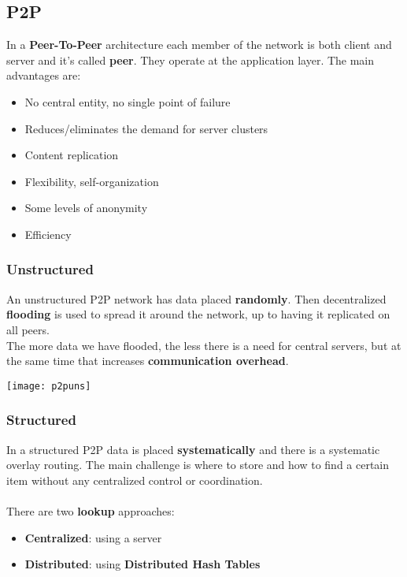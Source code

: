 \subsection{P2P}
In a \textbf{Peer-To-Peer} architecture each member of the network is both client and server and it's called \textbf{peer}. They operate at the application layer. The main advantages are:
\begin{itemize}
	\item No central entity, no single point of failure
	\item Reduces/eliminates the demand for server clusters
	\item Content replication
	\item Flexibility, self-organization
	\item Some levels of anonymity
	\item Efficiency
\end{itemize}

\subsubsection{Unstructured}
An unstructured P2P network has data placed \textbf{randomly}. Then decentralized \textbf{flooding} is used to spread it around the network, up to having it replicated on all peers.\\
The more data we have flooded, the less there is a need for central servers, but at the same time that increases \textbf{communication overhead}.
\begin{center}
	\texttt{[image: p2puns]}
\end{center}

\subsubsection{Structured}
In a structured P2P data is placed \textbf{systematically} and there is a systematic overlay routing. The main challenge is where to store and how to find a certain item without any centralized control or coordination.\\\\
There are two \textbf{lookup} approaches:
\begin{itemize}
	\item \textbf{Centralized}: using a server
	\item \textbf{Distributed}: using \textbf{Distributed Hash Tables}
\end{itemize}

